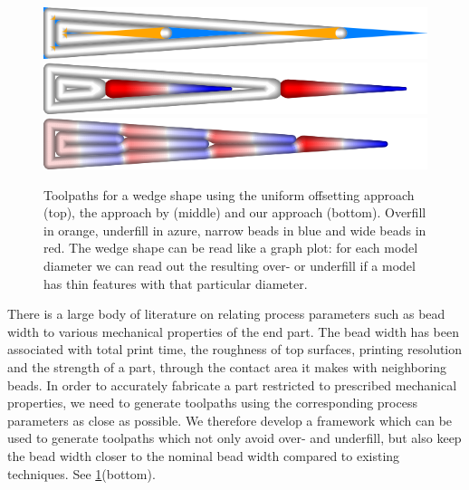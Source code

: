 \begin{figure}\centering
\includegraphics[width=\columnwidth]{sources/intro/TEST_naive_accuracy.png}
\includegraphics[width=\columnwidth]{sources/intro/TEST_Center_widths.png}
\includegraphics[width=\columnwidth]{sources/intro/TEST_InwardDistributed_widths.png}
\caption{
Toolpaths for a wedge shape using the uniform offsetting approach (top), the approach by \citeauthor{Jin2017JMS}(middle) and our approach (bottom).
Overfill in orange, underfill in azure, narrow beads in blue and wide beads in red.
The wedge shape can be read like a graph plot: for each model diameter we can read out the resulting over- or underfill if a model has thin features with that particular diameter.
}
\label{intro_wedge}
\end{figure}



There is a large body of literature on relating process parameters such as bead width to various mechanical properties of the end part.
The bead width has been associated with total print time, the roughness of top surfaces, printing resolution and the strength of a part, through the contact area it makes with neighboring beads. \cite{N.Turner2014,ahn2002anisotropic}
In order to accurately fabricate a part restricted to prescribed mechanical properties, we need to generate toolpaths using the corresponding process parameters as close as possible.
We therefore develop a framework which can be used to generate toolpaths which not only avoid over- and underfill, but also keep the bead width closer to the nominal bead width compared to existing techniques.
See \cref{intro_wedge}(bottom).

